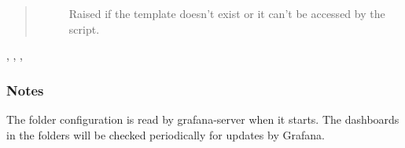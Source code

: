 \documentclass[letterpaper,10pt,english]{sphinxmanual}
\begin{document}
\begin{fulllineitems}
\begin{quote}
\begin{description}
\begin{description}
\item[{}] \leavevmode
Raised if the template doesn’t exist or it can’t be accessed by the script.

\end{description}

\end{description}\end{quote}




{\hyperref[\detokenize{yamlUtility:yamlUtility.getYamlContent}]{}}, {\hyperref[\detokenize{yamlUtility:yamlUtility.writeYamlContent}]{}}, , 


\subsubsection*{Notes}

The folder configuration is read by grafana-server when it starts. The
dashboards in the folders will be checked periodically for updates by Grafana.

\end{fulllineitems}

\end{document}
